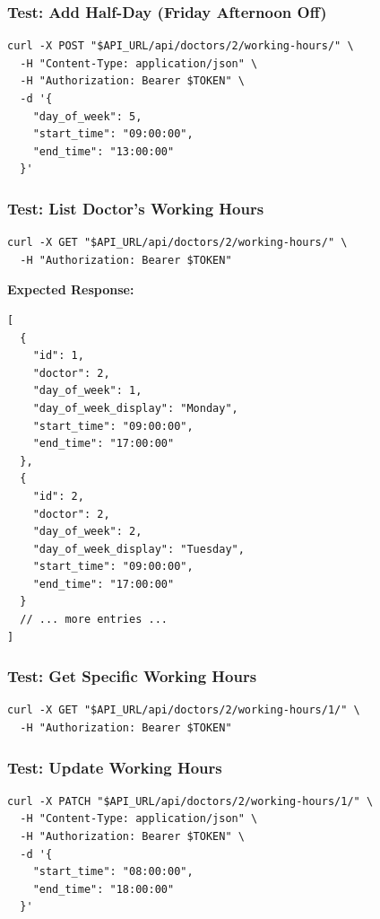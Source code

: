 \documentclass[12pt,a4paper]{article}
\begin{document}
\subsubsection{Test: Add Half-Day (Friday Afternoon Off)}
\begin{lstlisting}[style=bash]
curl -X POST "$API_URL/api/doctors/2/working-hours/" \
  -H "Content-Type: application/json" \
  -H "Authorization: Bearer $TOKEN" \
  -d '{
    "day_of_week": 5,
    "start_time": "09:00:00",
    "end_time": "13:00:00"
  }'
\end{lstlisting}

\subsubsection{Test: List Doctor's Working Hours}
\begin{lstlisting}[style=bash]
curl -X GET "$API_URL/api/doctors/2/working-hours/" \
  -H "Authorization: Bearer $TOKEN"
\end{lstlisting}

\textbf{Expected Response:}
\begin{lstlisting}[style=json]
[
  {
    "id": 1,
    "doctor": 2,
    "day_of_week": 1,
    "day_of_week_display": "Monday",
    "start_time": "09:00:00",
    "end_time": "17:00:00"
  },
  {
    "id": 2,
    "doctor": 2,
    "day_of_week": 2,
    "day_of_week_display": "Tuesday",
    "start_time": "09:00:00",
    "end_time": "17:00:00"
  }
  // ... more entries ...
]
\end{lstlisting}

\subsubsection{Test: Get Specific Working Hours}
\begin{lstlisting}[style=bash]
curl -X GET "$API_URL/api/doctors/2/working-hours/1/" \
  -H "Authorization: Bearer $TOKEN"
\end{lstlisting}

\subsubsection{Test: Update Working Hours}
\begin{lstlisting}[style=bash]
curl -X PATCH "$API_URL/api/doctors/2/working-hours/1/" \
  -H "Content-Type: application/json" \
  -H "Authorization: Bearer $TOKEN" \
  -d '{
    "start_time": "08:00:00",
    "end_time": "18:00:00"
  }'
\end{lstlisting}
\end{document}
